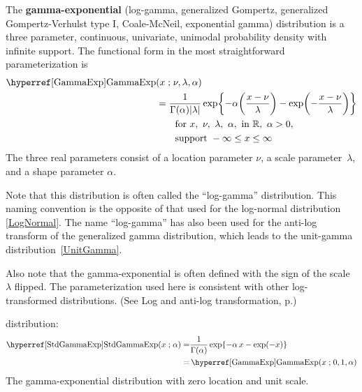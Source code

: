

\label{sec:GammaExp}
{} 

The {\bf gamma-exponential} (log-gamma, generalized Gompertz, generalized Gompertz-Verhulst type I, Coale-McNeil, exponential gamma) distribution \cite{Bartlett1946,Prentice1974,Johnson1995} is  a three parameter, continuous, univariate, unimodal probability density with infinite support. The functional form in the most straightforward parameterization is
\begin{align}
\label{GammaExp}
\opr{GammaExp}&(x\given \nu, \lambda, \alpha) 
\\ \notag &=
\frac{1}{ \Gamma(\alpha) |\lambda|}  \exp\Left\{- \alpha \Left(\frac{x-\nu}{\lambda}\Right) - \exp\Left(- \frac{x-\nu}{\lambda}\Right)  \Right\} \checked 
\\ \notag
& \qquad \text{for } x,\ \nu,\ \lambda,\ \alpha,\   \text{in } \mathbb{R}, 
\ \alpha>0, \ 
\\ \notag
& \qquad \text{support } -\infty \leq x \leq \infty
\notag
\end{align}
The three real parameters consist of a location parameter $\nu$, a scale parameter~$\lambda$, and a shape parameter $\alpha$. 

Note that this distribution is often called the ``log-gamma'' distribution. This naming convention is the opposite of that used for the log-normal distribution \eqref{LogNormal}. The name  ``log-gamma''  has also been used for the anti-log transform of the generalized gamma distribution, which leads to the unit-gamma distribution~\eqref{UnitGamma}.%

Also note that the gamma-exponential is often defined with the sign of the scale $\lambda$ flipped. The parameterization used here is consistent with other log-transformed distributions. (See Log and anti-log transformation, p.\pageref{logtransform}) 





 distribution:
\begin{align}
\label{StdGammaExp}
\opr{StdGammaExp}(x\given  \alpha) 
=&
\frac{1}{\Gamma(\alpha) }  \exp\Left\{- \alpha\, x - \exp (-x)  \Right\}  \checked
\\ \notag =& \opr{GammaExp}(x\given 0,1,\alpha) \checked
\end{align} 
The gamma-exponential distribution with zero location and unit scale.

